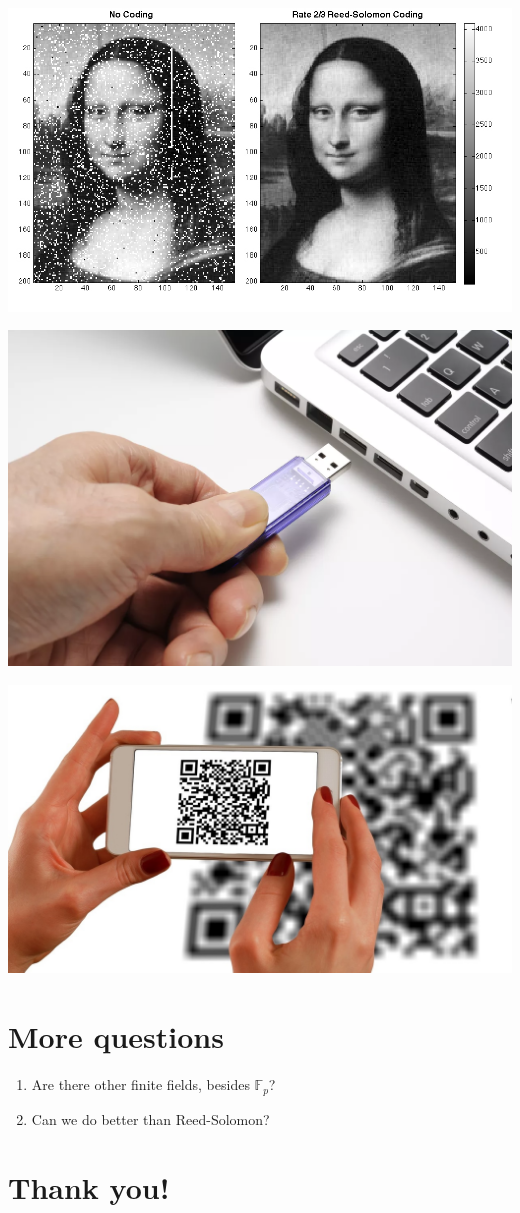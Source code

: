 \documentclass[11pt]{article}
\begin{document}
\begin{center}
\includegraphics[width=.9\linewidth]{monalisa.jpg}
\end{center}

\begin{center}
\includegraphics[width=.9\linewidth]{flashdrive.png}
\end{center}

\begin{center}
\includegraphics[width=.9\linewidth]{qr.jpg}
\end{center}

\section*{More questions}
\label{sec:org0178952}

\begin{enumerate}
\item Are there other finite fields, besides \(\mathbb F_p\)?
\item Can we do better than Reed-Solomon?
\end{enumerate}

\section*{Thank you!}
\label{sec:orga892d87}
\end{document}
